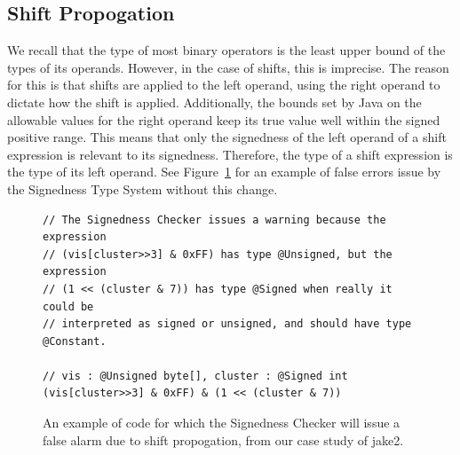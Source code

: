 \subsection{Shift Propogation}
We recall that the type of most binary operators is the least upper bound of
the types of its operands.
However, in the case of shifts, this is imprecise.
The reason for this is that shifts are applied to the left operand, using the
right operand to dictate how the shift is applied. Additionally, the bounds
set by Java on the allowable values for the right operand keep its true value
well within the signed positive range. This means that only the signedness
of the left operand of a shift expression is relevant to its signedness.
Therefore, the type of a shift expression is the type of its left operand. See
Figure~\ref{fig:shiftpropo} for an example of false errors issue by the
Signedness Type System without this change.

\begin{figure}
\begin{lstlisting}
// The Signedness Checker issues a warning because the expression
// (vis[cluster>>3] & 0xFF) has type @Unsigned, but the expression
// (1 << (cluster & 7)) has type @Signed when really it could be
// interpreted as signed or unsigned, and should have type @Constant.

// vis : @Unsigned byte[], cluster : @Signed int
(vis[cluster>>3] & 0xFF) & (1 << (cluster & 7))
\end{lstlisting}
\caption{An example of code for which the Signedness Checker will issue a false
alarm due to shift propogation, from our case study of jake2.}
\label{fig:shiftpropo}
\end{figure}

